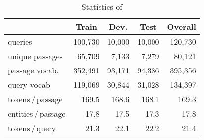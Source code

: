 \begin{table}[!ht]
\small
\begin{tabular}{@{}l|r|r|r|r@{}}
\toprule
                     & \multicolumn{1}{c|}{Train}   & \multicolumn{1}{c|}{Dev.}   & \multicolumn{1}{c|}{Test}   & \multicolumn{1}{c}{Overall} \\ \midrule
queries          & 100,730                      & 10,000                      & 10,000                      & 120,730                     \\
unique passages    & 65,709                       & 7,133                       & 7,279                       & 80,121                      \\ \midrule
passage vocab.       & 352,491 & 93,171 & 94,386 & 395,356 \\
query vocab.      & 119,069 & 30,844 & 31,028 & 134,397 \\ \midrule
tokens\,/\,passage   & 169.5                        & 168.6                       & 168.1                       & 169.3                       \\
entities\,/\,passage & 17.8                         & 17.5                        & 17.3                        & 17.8                        \\
tokens\,/\,query  & 21.3                         & 22.1                        & 22.2                        & 21.4                        \\ \bottomrule
\end{tabular}
\caption{Statistics of \ReCoRD}
\label{tab:statistics}
\end{table}

